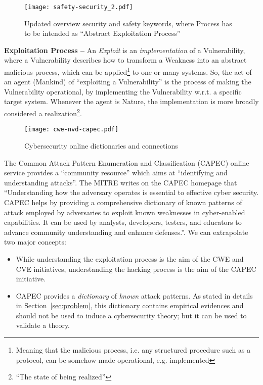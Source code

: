 \begin{figure}[t]
	\centering
	\texttt{[image: safety-security\_2.pdf]}
	\caption{Updated overview security and safety keywords, where Process
	has to be intended as ``Abstract Exploitation Process''}
	\label{fig:safety-security_2}
\end{figure}

\begin{definition}{\bf Exploitation Process --} An \emph{Exploit} is an \emph{implementation} of
a Vulnerability, where a Vulnerability describes how to transform a
Weakness into an abstract malicious process, which can be applied\footnote{Meaning that the
malicious process, i.e.  any structured procedure such as a protocol, can be
somehow made operational, e.g. implemented} to one or many systems. So, the act
of an agent (Mankind) of ``exploiting a Vulnerability'' is the process of
making the Vulnerability operational, by implementing the Vulnerability w.r.t.
a specific target system.  Whenever the agent is Nature, the implementation is
more broadly considered a realization\footnote{``The state of being
realized''\autocite{Merriam2020realization}}. 
\end{definition}

\begin{figure}[t]
	\centering
	\texttt{[image: cwe-nvd-capec.pdf]}
	\caption{Cybersecurity online dictionaries and connections}
	\label{fig:cwe-nvd-capec}
\end{figure}

The Common Attack Pattern Enumeration and
Classification\autocite{MITRE2020CAPEC} (CAPEC) online service provides a
``community resource'' which aims at ``identifying and understanding attacks''.
The MITRE writes on the CAPEC homepage that ``Understanding how the adversary
operates is essential to effective cyber security. CAPEC helps by providing a
comprehensive dictionary of known patterns of attack employed by adversaries to
exploit known weaknesses in cyber-enabled capabilities. It can be used by
analysts, developers, testers, and educators to advance community understanding
and enhance defenses.''. We can extrapolate two major concepts: 
\begin{itemize}
	\item While understanding the exploitation process is the aim of the
		CWE and CVE initiatives, understanding the hacking process is
		the aim of the CAPEC initiative.
	\item CAPEC provides a \emph{dictionary} of \emph{known} attack patterns.
		As stated in details in Section~\ref{sec:problem}, this dictionary contains
		empirical evidences and should not be used to induce a cybersecurity 
		theory; but it can be used to validate a theory.
\end{itemize}

